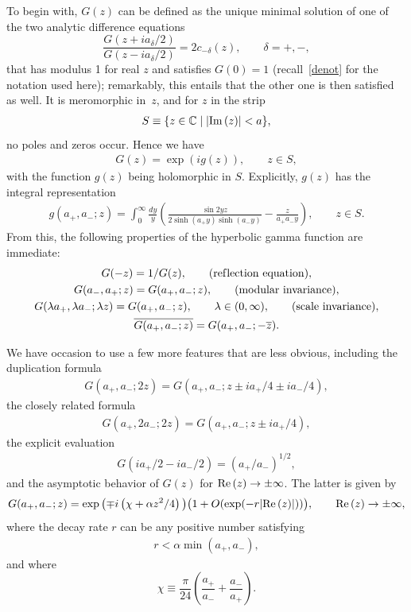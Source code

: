 \documentclass[11pt]{article}
\numberwithin{equation}{section}
\newcommand{\C}{{\mathbb C}}
\newcommand{\re}{{\rm Re}\, }
\newcommand{\im}{{\rm Im}\, }
\newcommand{\aaa}{a_{+},a_{-}}
\begin{document}
 To begin with, $G(z)$ can be def\/ined as the unique minimal solution of one of the two analytic dif\/ference equations
\begin{equation}\label{Gades}
	\frac{G(z+ia_\delta/2)}{G(z-ia_\delta/2)} = 2c_{-\delta}(z),\qquad  \delta=+,-,
\end{equation}
that has modulus 1 for real $z$ and satisf\/ies $G(0)=1$ (recall~\eqref{denot} for the notation used here); remarkably, this entails that the other one is then satisf\/ied as well.
It is meromorphic in~$z$,
and for $z$ in the strip
\begin{gather}\label{strip}
S\equiv \{z\in\C \mid |\im (z)|<a\},
\end{gather}
no poles and zeros occur. Hence we have
\begin{gather}\label{Gg}
G(z)=\exp(ig(z)),\qquad z\in S,
\end{gather}
with the function $g(z)$ being holomorphic in $S$.
 Explicitly, $g(z)$ has the integral representation
\begin{gather}\label{ghyp}
g(a_{+},a_{-};z) =\int_0^\infty\frac{dy}{y}\left(\frac{\sin 2yz}{2\sinh(a_{+}y)\sinh(a_{-}y)} - \frac{z}{a_{+}a_{-} y}\right),\qquad z\in S.
\end{gather}
From this, the following properties of the hyperbolic gamma function are immediate:
\begin{gather}\label{refl}	
G(-z) = 1/G(z),\qquad ({\rm ref\/lection\ equation}),
\\
\label{modinv}
G(a_-,a_+;z) = G(a_+,a_-;z),\qquad  ({\rm modular\ invariance}),
\\
\label{sc}
	G(\lambda a_+,\lambda a_-;\lambda z) = G(a_+,a_-;z),\qquad \lambda\in(0,\infty),\qquad ({\rm scale\ invariance}),
\\
\label{Gcon}
\overline{G(\aaa;z)}=G(\aaa;-\overline{z}).
\end{gather}

We have occasion to use a few more features that are less obvious, including the duplication formula
\begin{gather}\label{dupl}
G(\aaa;2z)=G(\aaa;z\pm ia_{+}/4 \pm ia_{-}/4),
\end{gather}
the closely related formula
\begin{gather}\label{G2}
G(a_{+},2a_{-};2z)=G(\aaa;z\pm ia_{+}/4),
\end{gather}
the explicit evaluation
\begin{gather}\label{Geval}
G(ia_{+}/2-ia_{-}/2)=(a_{+}/a_{-})^{1/2},
\end{gather}
and the asymptotic behavior of $G(z)$ for $\re (z)\to\pm \infty$. The latter is given by
\begin{gather}\label{Gas}
	G(\aaa;z) = \exp \big({\mp} i\left(\chi+\alpha z^2/4\right)\big)\big(1 + O(\exp(-r |\re(z)|))\big),\qquad \re(z)\to\pm\infty,
\end{gather}
where the decay rate $r$ can be any positive number satisfying
\begin{gather}
r <\alpha \min(a_+,a_-),
\end{gather}
and where
\begin{equation}\label{chi}
 \chi \equiv \frac{\pi}{24}\left(\frac{a_+}{a_-} + \frac{a_-}{a_+}\right).
\end{equation}
\end{document}
